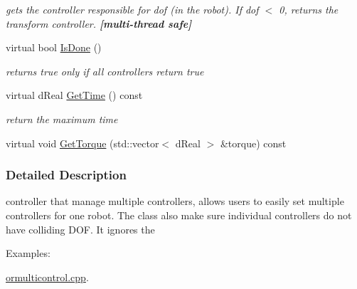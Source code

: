 \begin{DoxyCompactItemize}
\begin{DoxyCompactList}\small\item\em gets the controller responsible for dof (in the robot). If dof $<$ 0, returns the transform controller. {\bfseries \mbox{[}multi-\/thread safe\mbox{]}} \item\end{DoxyCompactList}\item 
\hypertarget{classOpenRAVE_1_1MultiController_a223430ff4833c832a9689262eeb6a509}{
virtual bool \hyperlink{classOpenRAVE_1_1MultiController_a223430ff4833c832a9689262eeb6a509}{IsDone} ()}
\label{classOpenRAVE_1_1MultiController_a223430ff4833c832a9689262eeb6a509}

\begin{DoxyCompactList}\small\item\em returns true only if all controllers return true \item\end{DoxyCompactList}\item 
\hypertarget{classOpenRAVE_1_1MultiController_aeeadca62100efc2104208ddac5603bef}{
virtual dReal \hyperlink{classOpenRAVE_1_1MultiController_aeeadca62100efc2104208ddac5603bef}{GetTime} () const }
\label{classOpenRAVE_1_1MultiController_aeeadca62100efc2104208ddac5603bef}

\begin{DoxyCompactList}\small\item\em return the maximum time \item\end{DoxyCompactList}\item 
virtual void \hyperlink{classOpenRAVE_1_1MultiController_aa9cb5e097c6ecb5d0b157f9b7c581085}{GetTorque} (std::vector$<$ dReal $>$ \&torque) const 
\end{DoxyCompactItemize}


\subsubsection{Detailed Description}
controller that manage multiple controllers, allows users to easily set multiple controllers for one robot. The class also make sure individual controllers do not have colliding DOF. It ignores the \begin{Desc}
\item[Examples: ]\par


\hyperlink{ormulticontrol_8cpp-example}{ormulticontrol.cpp}.

\end{Desc}


